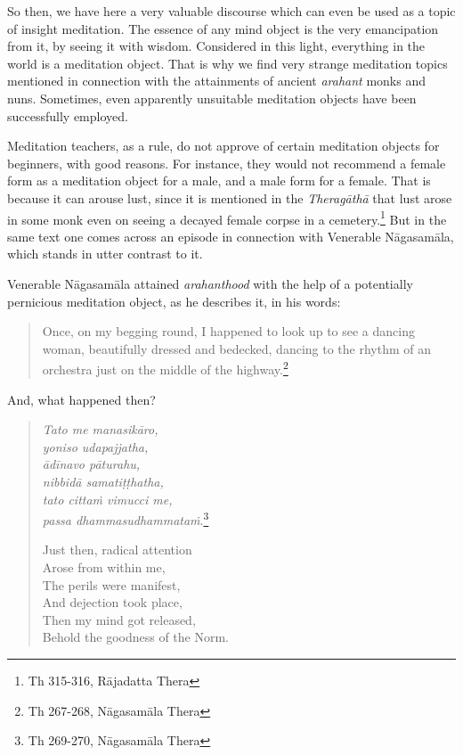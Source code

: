 So then, we have here a very valuable discourse which can even be used as a topic of insight meditation. The essence of any mind object is the very emancipation from it, by seeing it with wisdom. Considered in this light, everything in the world is a meditation object. That is why we find very strange meditation topics mentioned in connection with the attainments of ancient \emph{arahant} monks and nuns. Sometimes, even apparently unsuitable meditation objects have been successfully employed.

Meditation teachers, as a rule, do not approve of certain meditation objects for beginners, with good reasons. For instance, they would not recommend a female form as a meditation object for a male, and a male form for a female. That is because it can arouse lust, since it is mentioned in the \emph{Theragāthā} that lust arose in some monk even on seeing a decayed female corpse in a cemetery.\footnote{Th 315-316, Rājadatta Thera} But in the same text one comes across an episode in connection with Venerable Nāgasamāla, which stands in utter contrast to it.

Venerable Nāgasamāla attained \emph{arahanthood} with the help of a potentially pernicious meditation object, as he describes it, in his words:

\begin{quote}
Once, on my begging round, I happened to look up to see a dancing woman, beautifully dressed and bedecked, dancing to the rhythm of an orchestra just on the middle of the highway.\footnote{Th 267-268, Nāgasamāla Thera}
\end{quote}

And, what happened then?

\begin{quote}
\emph{Tato me manasikāro,}\\
\emph{yoniso udapajjatha,}\\
\emph{ādīnavo pāturahu,}\\
\emph{nibbidā samatiṭṭhatha,}\\
\emph{tato cittaṁ vimucci me,}\\
\emph{passa dhammasudhammataṁ}.\footnote{Th 269-270, Nāgasamāla Thera}

Just then, radical attention\\
Arose from within me,\\
The perils were manifest,\\
And dejection took place,\\
Then my mind got released,\\
Behold the goodness of the Norm.
\end{quote}

